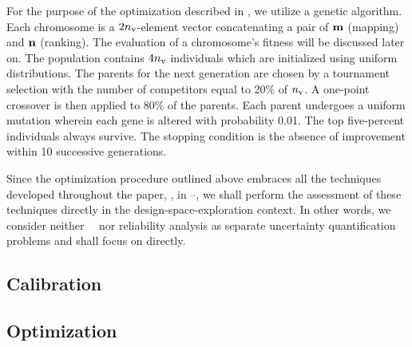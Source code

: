 For the purpose of the optimization described in , we utilize a genetic algorithm.
Each chromosome is a $2 {n_\text{v}}$-element vector concatenating a pair of $\mathbf{m}$ (mapping) and $\mathbf{n}$ (ranking).
The evaluation of a chromosome's fitness will be discussed later on.
The population contains $4 {n_\text{v}}$ individuals which are initialized using uniform distributions.
The parents for the next generation are chosen by a tournament selection with the number of competitors equal to 20\% of ${n_\text{v}}$.
A one-point crossover is then applied to 80\% of the parents.
Each parent undergoes a uniform mutation wherein each gene is altered with probability 0.01.
The top five-percent individuals always survive.
The stopping condition is the absence of improvement within 10 successive generations.

Since the optimization procedure outlined above embraces all the techniques developed throughout the paper, \ie, in --, we shall perform the assessment of these techniques directly in the design-space-exploration context.
In other words, we consider neither \DSS\ \ta\ nor reliability analysis as separate uncertainty quantification problems and shall focus on  directly.

\subsection{Calibration} 


\subsection{Optimization} 

